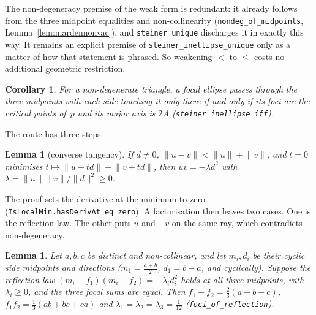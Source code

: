 \documentclass[11pt]{article}
\newtheorem{lemma}[theorem]{Lemma}
\newtheorem{corollary}[theorem]{Corollary}
\theoremstyle{remark}
\newcommand{\lean}[1]{\texttt{#1}}
\newcommand{\nm}[1]{\lVert #1\rVert}
\begin{document}
The non-degeneracy premise of the weak form is redundant: it already follows from the three
midpoint equalities and non-collinearity (\lean{nondeg\_of\_midpoints},
Lemma~\ref{lem:mardennonvac}), and \lean{steiner\_unique} discharges it in exactly this way. It
remains an explicit premise of \lean{steiner\_inellipse\_unique} only as a matter of how that
statement is phrased.
So weakening $<$ to $\le$ costs no additional geometric restriction.

\begin{corollary}\label{cor:iff}
For a non-degenerate triangle, a focal ellipse passes through the three midpoints with each side
touching it only there if and only if its foci are the critical points of~$p$ and its major axis is
$2A$ (\lean{steiner\_inellipse\_iff}).
\end{corollary}

The route has three steps.

\begin{lemma}[converse tangency]\label{lem:convtan}
If $d\ne0$, $\nm{u-v}<\nm u+\nm v$, and $t=0$ minimises $t\mapsto\nm{u+td}+\nm{v+td}$, then
$uv=-\lambda d^2$ with $\lambda=\nm u\nm v/\nm d^2\ge0$.
\end{lemma}

The proof sets the derivative at the minimum to zero (\lean{IsLocalMin.hasDerivAt\_eq\_zero}).
A factorisation then leaves two cases. One is the reflection law. The other puts $u$ and $-v$ on
the same ray, which contradicts non-degeneracy.

\begin{lemma}\label{lem:foci}
Let $a,b,c$ be distinct and non-collinear, and let $m_i,d_i$ be their cyclic side midpoints and
directions ($m_1=\frac{a+b}2$, $d_1=b-a$, and cyclically). Suppose the reflection law $(m_i-f_1)(m_i-f_2)=-\lambda_i d_i^2$ holds at all three midpoints, with
$\lambda_i\ge0$, and the three focal sums are equal. Then
$f_1+f_2=\frac23(a+b+c)$, $f_1f_2=\frac13(ab+bc+ca)$ and
$\lambda_1=\lambda_2=\lambda_3=\frac1{12}$ (\lean{foci\_of\_reflection}).
\end{lemma}
\end{document}
